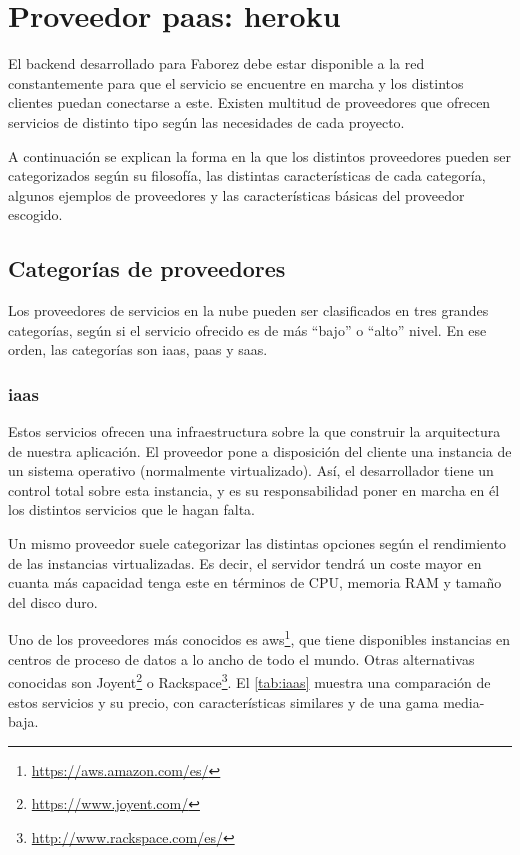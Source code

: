 \documentclass[main]{subfiles}
\begin{document}
\section[Proveedor IaaS: Heroku]{Proveedor \gls{paas}: \gls{heroku}}
\label{sec:tech-heroku}

El \gls{backend} desarrollado para Faborez debe estar disponible a la red constantemente para que el servicio se encuentre en marcha y los distintos clientes puedan conectarse a este. Existen multitud de proveedores que ofrecen servicios de distinto tipo según las necesidades de cada proyecto.

A continuación se explican la forma en la que los distintos proveedores pueden ser categorizados según su filosofía, las distintas características de cada categoría, algunos ejemplos de proveedores y las características básicas del proveedor escogido.

\subsection{Categorías de proveedores}

Los proveedores de servicios en la nube pueden ser clasificados en tres grandes categorías, según si el servicio ofrecido es de más \enquote{bajo} o \enquote{alto} nivel. En ese orden, las categorías son \acrfull{iaas}, \acrfull{paas} y \acrfull{saas}.

\subsubsection[\Acrshort*{iaas}]{\Acrlong{iaas}}
Estos servicios ofrecen una infraestructura sobre la que construir la arquitectura de nuestra aplicación. El proveedor pone a disposición del cliente una instancia de un sistema operativo (normalmente virtualizado). Así, el desarrollador tiene un control total sobre esta instancia, y es su responsabilidad poner en marcha en él los distintos servicios que le hagan falta.

Un mismo proveedor suele categorizar las distintas opciones según el rendimiento de las instancias virtualizadas. Es decir, el servidor tendrá un coste mayor en cuanta más capacidad tenga este en términos de CPU, memoria RAM y tamaño del disco duro.

Uno de los proveedores más conocidos es \gls{aws}\footnote{\url{https://aws.amazon.com/es/}}, que tiene disponibles instancias en centros de proceso de datos a lo ancho de todo el mundo. Otras alternativas conocidas son Joyent\footnote{\url{https://www.joyent.com/}} o Rackspace\footnote{\url{http://www.rackspace.com/es/}}.  El \cref{tab:iaas} muestra una comparación de estos servicios y su precio, con características similares y de una gama media-baja.
\end{document}
